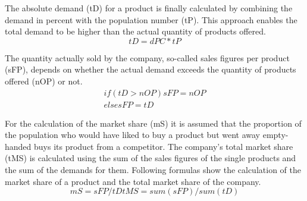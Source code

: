 The absolute demand (\gls{tD}) for a product is finally calculated by combining the demand in percent with the population number (\gls{tP}). This approach enables the total demand to be higher than the actual quantity of products offered.
\begin{equation}
tD= dPC * tP    
\end{equation}

The quantity actually sold by the company, so-called sales figures per product (\gls{sFP}), depends on whether the actual demand exceeds the quantity of products offered (\gls{nOP}) or not.
\begin{equation}
\label{func:salesFigure}
\begin{aligned}
if ( tD > nOP ) { sFP = nOP } \\
else { sFP = tD }    
\end{aligned}
\end{equation}

For the calculation of the market share (\gls{mS}) it is assumed that the proportion of the population who would have liked to buy a product but went away empty-handed buys its product from a competitor. The company's total market share (\gls{tMS}) is calculated using the sum of the sales figures of the single products and the sum of the demands for them. Following formulas show the calculation of the market share of a product and the total market share of the company.  
\begin{equation}
\label{func:marketShare}
mS = sFP / tD
tMS = sum(sFP) / sum(tD)   
\end{equation}

